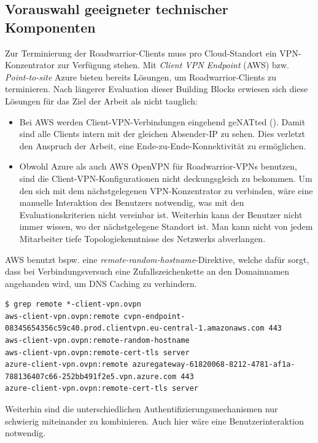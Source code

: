 \subsection{Vorauswahl geeigneter technischer Komponenten}
Zur Terminierung der Roadwarrior-Clients muss pro Cloud-Standort ein VPN-Konzentrator zur Verfügung stehen. Mit \textit{Client VPN Endpoint} (AWS) bzw. \textit{Point-to-site} Azure bieten bereits Lösungen, um Roadwarrior-Clients zu terminieren. Nach längerer Evaluation dieser Building Blocks erwiesen sich diese Lösungen für das Ziel der Arbeit als nicht tauglich:
\begin{itemize}
\item Bei AWS werden Client-VPN-Verbindungen eingehend geNATted (). Damit sind alle Clients intern mit der gleichen Absender-IP zu sehen. Dies verletzt den Anspruch der Arbeit, eine Ende-zu-Ende-Konnektivität zu ermöglichen.
\item Obwohl Azure als auch AWS OpenVPN für Roadwarrior-VPNs benutzen, sind die Client-VPN-Konfigurationen nicht \glqq deckungsgleich\grqq{} zu bekommen. Um den sich mit dem nächstgelegenen VPN-Konzentrator zu verbinden, wäre eine manuelle Interaktion des Benutzers notwendig, was mit den Evaluationskriterien nicht vereinbar ist. Weiterhin kann der Benutzer nicht immer wissen, wo der nächstgelegene Standort ist. Man kann nicht von jedem Mitarbeiter tiefe Topologiekenntnisse des Netzwerks abverlangen.
\end{itemize}

AWS benutzt bspw. eine \textit{remote-random-hostname}-Direktive, welche dafür sorgt, dass bei Verbindungsversuch eine Zufallszeichenkette an den Domainnamen angehanden wird, um DNS Caching zu verhindern.
\begin{lstlisting}[label=ovpn_configs_aws_azure,caption=Auszüge aus den OpenVPN-Client-Konfigurationen für AWS und Azure]
$ grep remote *-client-vpn.ovpn
aws-client-vpn.ovpn:remote cvpn-endpoint-08345654356c59c40.prod.clientvpn.eu-central-1.amazonaws.com 443
aws-client-vpn.ovpn:remote-random-hostname
aws-client-vpn.ovpn:remote-cert-tls server
azure-client-vpn.ovpn:remote azuregateway-61820068-8212-4781-af1a-788136407c66-252bb491f2e5.vpn.azure.com 443
azure-client-vpn.ovpn:remote-cert-tls server
\end{lstlisting}

Weiterhin sind die unterschiedlichen Authentifizierungsmechanismen nur schwierig miteinander zu kombinieren. Auch hier wäre eine Benutzerinteraktion notwendig.

